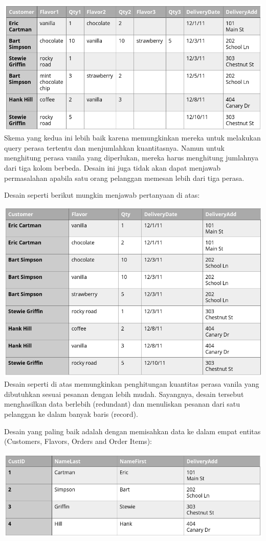 \documentclass[]{book}
\begin{document}
\includegraphics{./img/tab2_order.png}
Skema yang kedua ini lebih baik karena memungkinkan mereka untuk melakukan query perasa tertentu dan menjumlahkan kuantitasnya. Namun untuk menghitung perasa vanila yang diperlukan, mereka harus menghitung jumlahnya dari tiga kolom berbeda. Desain ini juga tidak akan dapat menjawab permasalahan apabila satu orang pelanggan memesan lebih dari tiga perasa.

Desain seperti berikut mungkin menjawab pertanyaan di atas:

\includegraphics{./img/tab3_order.png}
Desain seperti di atas memungkinkan penghitungan kuantitas perasa vanila yang dibutuhkan sesuai pesanan dengan lebih mudah. Sayangnya, desain tersebut menghasilkan data berlebih (redundant) dan menuliskan pesanan dari satu pelanggan ke dalam banyak baris (record).

Desain yang paling baik adalah dengan memisahkan data ke dalam empat entitas (Customers, Flavors, Orders and Order Items):

\includegraphics{./img/tab4_order.png}
\end{document}
